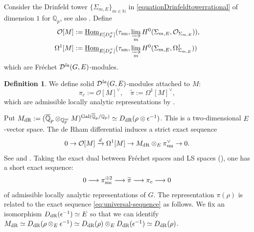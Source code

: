 \documentclass[a4paper,10pt]{amsart}
\theoremstyle{remark}
\theoremstyle{definition}
\newtheorem{definition}[theorem]{Definition}
\theoremstyle{plain}
\numberwithin{equation}{section}
\newcommand{\bbN}{{\mathbb N}}
\newcommand{\bbQ}{{\mathbb Q}}
\newcommand{\calD}{{\mathcal D}}
\newcommand{\calO}{{\mathcal O}}
\newcommand{\dR}{{\rm dR}}
\newcommand{\Gal}{{\rm Gal}}
\newcommand{\Hom}{{\rm Hom}}
\newcommand{\uHom}{\underline{\Hom}}
\newcommand{\la}{{\it la}}
\newcommand{\sm}{{\rm sm}}
\begin{document}
Consider the Drinfeld tower $\{\Sigma_{m,E}\}_{m\in\bbN}$ in \eqref{equationDrinfeldtowerrational} of dimension $1$ for $\bbQ_p$, see also \cite[\S~3.1]{dospinescuLeBras2017revetements}. Define
\begin{align*}
 \calO[M]&:=\uHom_{E[D_p^\times]}(\tau_{\sm},
 \varinjlim_m H^0(\Sigma_{m,E},\calO_{\Sigma_{m,E}})),\\
 \Omega^1[M]&:=\uHom_{E[D_p^\times]}(\tau_{\sm},
 \varinjlim_m H^0(\Sigma_{m,E},\Omega^1_{\Sigma_{m,E}}))
\end{align*}
which are Fr\'echet $\calD^{\la}(G,E)$-modules. 
\begin{definition}\label{definitionpippic}
	We define solid $\calD^{\la}(G,E)$-modules attached to $M$:
	\begin{equation}
		\pi_c:=\calO[M]^{\vee},\quad\widetilde{\pi}:=\Omega^1[M]^{\vee},
	\end{equation}
	which are admissible locally analytic representations by \cite[Thm.~1.2, Rem.~1.3(b)]{dospinescuLeBras2017revetements}.
\end{definition}
Put $M_{\dR}:= (\overline{\mathbb{Q}}_p\otimes_{\bbQ_p^{\mathrm{ur}}}M)^{\Gal(\overline{\mathbb{Q}}_p/\bbQ_p)}\simeq D_{\rm dR}(\rho\otimes \epsilon^{-1})$. This is a two-dimensional $E$-vector space. The de Rham differential induces a strict exact sequence
\begin{equation}\label{eq:universal-sequencedual}
	0\rightarrow\calO[M]\xrightarrow{d}\Omega^1[M]
 \rightarrow M_{\dR}\otimes_E\pi_{\sm}^{\vee}\rightarrow0.
\end{equation}
See \cite[Thm.~1.4]{dospinescuLeBras2017revetements} and
\cite[\S~2.1.5]{colmezDospinescuNiziol2020}. Taking the exact dual between Fr\'echet spaces and LS spaces (\cite[Thm.~3.40]{rodrigues2022solid}), one has a short exact sequence:
\begin{equation}\label{eq:universal-sequence} 0\longrightarrow \pi_{\sm}^{\oplus 2}
 \longrightarrow\widetilde\pi\longrightarrow\pi_c\longrightarrow0
\end{equation}
of admissible locally analytic representations of $G$. The representation $\pi(\rho)$ is related to the exact sequence \eqref{eq:universal-sequence} as follows. 	We fix an isomorphism $D_{\rm dR}(\epsilon^{-1})\simeq E$ so that we can identify $M_{\rm dR}\simeq D_{\rm dR}(\rho\otimes_E\epsilon^{-1})\simeq D_{\rm dR}(\rho)\otimes_ED_{\rm dR}(\epsilon^{-1})\simeq D_{\rm dR}(\rho)$.
\end{document}
